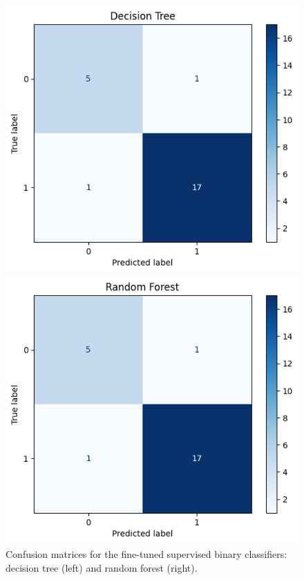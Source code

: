 \documentclass[12pt,a4paper]{article}
\numberwithin{figure}{section}
\numberwithin{table}{section}
\numberwithin{definition}{section}
\begin{document}
\begin{figure}[!h]
  \centering
  \begin{minipage}{0.5\textwidth}
    \includegraphics[width=\textwidth]{CM_decision_tree.png}
  \end{minipage}\hfill
  \begin{minipage}{0.5\textwidth}
    \includegraphics[width=\textwidth]{CM_random_forest.png}
  \end{minipage}
    \caption{Confusion matrices for the fine-tuned supervised binary classifiers: decision tree (left) and random forest (right).}
    \label{fig:cmsupervised}
\end{figure}
\end{document}
